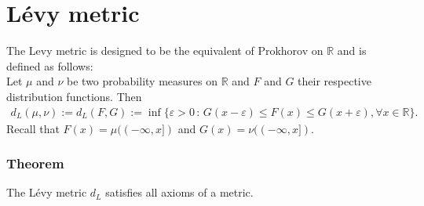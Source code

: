 \documentclass[11pt,a4paper]{article}
\begin{document}
\section{Lévy metric}
The Levy metric is designed to be the equivalent of Prokhorov on $\mathbb{R}$ and is defined as follows:\vspace{1em}\\
Let $\mu$ and $\nu$ be two probability measures on $\mathbb{R}$ and $F$ and $G$ their respective distribution functions. Then 
\begin{align*}
d_L(\mu,\nu):=d_L(F,G):=\inf\lbrace\varepsilon>0\,:\,G(x-\varepsilon)\leq{}F(x)\leq{}G(x+\varepsilon), \forall{}x\in\mathbb{R}\rbrace.
\end{align*}
Recall that $F(x)=\mu((-\infty,x])$ and $G(x)=\nu((-\infty,x])$.
\subsubsection{Theorem}
The Lévy metric $d_L$ satisfies all axioms of a metric.
\end{document}
